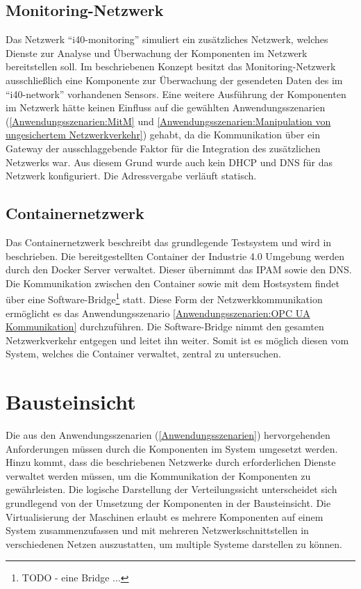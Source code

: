 \subsection{Monitoring-Netzwerk}
Das Netzwerk "`i40-monitoring"' simuliert ein zusätzliches Netzwerk, welches Dienste zur Analyse und Überwachung der Komponenten im Netzwerk bereitstellen soll. Im beschriebenen Konzept besitzt das Monitoring-Netzwerk ausschließlich eine Komponente zur Überwachung der gesendeten Daten des im "`i40-network"' vorhandenen Sensors. Eine weitere Ausführung der Komponenten im Netzwerk hätte keinen Einfluss auf die gewählten Anwendungsszenarien (\autoref{Anwendungsszenarien:MitM} und \autoref{Anwendungsszenarien:Manipulation von ungesichertem Netzwerkverkehr}) gehabt, da die Kommunikation über ein Gateway der ausschlaggebende Faktor für die Integration des zusätzlichen Netzwerks war. Aus diesem Grund wurde auch kein \ac{DHCP} und \ac{DNS} für das Netzwerk konfiguriert. Die Adressvergabe verläuft statisch.

\subsection{Containernetzwerk}
Das Containernetzwerk beschreibt das grundlegende Testsystem und wird in \cite{Weber2018} beschrieben. Die bereitgestellten Container der Industrie 4.0 Umgebung werden durch den Docker Server verwaltet. Dieser übernimmt das \ac{IPAM} sowie den \ac{DNS}. Die Kommunikation zwischen den Container sowie mit dem Hostsystem findet über eine Software-Bridge\footnote{TODO - eine Bridge ...} statt. Diese Form der Netzwerkkommunikation ermöglicht es das Anwendungsszenario \autoref{Anwendungsszenarien:OPC UA Kommunikation} durchzuführen. Die Software-Bridge nimmt den gesamten Netzwerkverkehr entgegen und leitet ihn weiter. Somit ist es möglich diesen vom System, welches die Container verwaltet, zentral zu untersuchen.

\section{Bausteinsicht}
Die aus den Anwendungsszenarien (\autoref{Anwendungsszenarien}) hervorgehenden Anforderungen müssen durch die Komponenten im System umgesetzt werden. Hinzu kommt, dass die beschriebenen Netzwerke durch erforderlichen Dienste verwaltet werden müssen, um die Kommunikation der Komponenten zu gewährleisten. Die logische Darstellung der Verteilungssicht unterscheidet sich grundlegend von der Umsetzung der Komponenten in der Bausteinsicht. Die Virtualisierung der Maschinen erlaubt es mehrere Komponenten auf einem System zusammenzufassen und mit mehreren Netzwerkschnittstellen in verschiedenen Netzen auszustatten, um multiple Systeme darstellen zu können.

